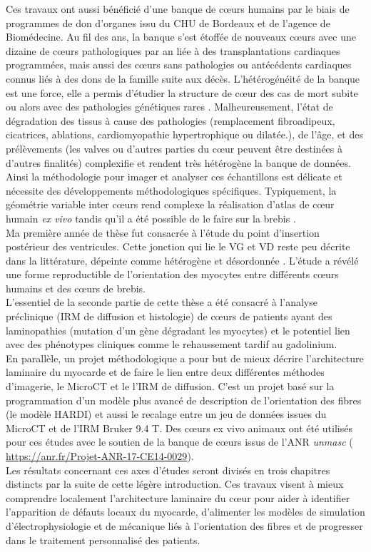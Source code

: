 Ces travaux ont aussi bénéficié d’une banque de cœurs humains par le biais de programmes de don d’organes issu du CHU de Bordeaux et de l’agence de Biomédecine. Au fil des ans, la banque s’est étoffée de nouveaux cœurs avec une dizaine de cœurs pathologiques par an liée à des transplantations cardiaques programmées, mais aussi des cœurs sans pathologies ou antécédents cardiaques connus liés à des dons de la famille suite aux décès. L’hétérogénéité de la banque est une force, elle a permis d’étudier la structure de cœur des cas de mort subite ou alors avec des pathologies génétiques rares \cite{estelle2023}. Malheureusement, l’état de dégradation des tissus à cause des pathologies (remplacement fibroadipeux,  cicatrices, ablations, cardiomyopathie hypertrophique ou dilatée.), de l’âge,  et des prélèvements (les valves ou d’autres parties du cœur peuvent être destinées à d’autres finalités) complexifie et rendent très hétérogène la banque de données. 
Ainsi la méthodologie pour imager et analyser ces échantillons est délicate et nécessite des développements méthodologiques spécifiques. Typiquement, la géométrie variable inter cœurs rend complexe la réalisation d’atlas de cœur humain \textit{ex vivo} tandis qu’il a été possible de le faire sur la brebis \cite{Magat2022}.
 \\
 Ma première année de thèse fut consacrée à l’étude du point d’insertion postérieur des ventricules. Cette jonction qui lie le VG et VD reste peu décrite dans la littérature, dépeinte comme hétérogène et désordonnée \cite{Smerup2008}. L’étude a révélé une forme reproductible de l’orientation des myocytes entre différents cœurs humains et des cœurs de brebis. 
 \\
  L'essentiel de la seconde partie de cette thèse a été consacré à l’analyse préclinique (IRM de diffusion et histologie) de cœurs de patients ayant des laminopathies (mutation d’un gène dégradant les myocytes) et le potentiel lien avec des phénotypes cliniques comme le rehaussement tardif au gadolinium.
\\
En parallèle, un projet méthodologique a pour but de mieux décrire l’architecture laminaire du myocarde et de faire le lien entre deux différentes méthodes d’imagerie, le MicroCT et le l’IRM de diffusion. C’est un projet basé sur la programmation d’un modèle plus avancé de description de l’orientation des fibres (le modèle HARDI) et aussi le recalage entre un jeu de données issues du MicroCT et de l’IRM Bruker 9.4 T. Des cœurs ex vivo animaux ont été utilisés pour ces études avec le soutien de la banque de cœurs issus de l’ANR \textit{unmasc} ( \href{https://anr.fr/Projet-ANR-17-CE14-0029}{https://anr.fr/Projet-ANR-17-CE14-0029}).
\\
Les résultats concernant ces axes d’études seront divisés en trois chapitres distincts par la suite de cette légère introduction. Ces travaux visent à mieux comprendre localement l’architecture laminaire du cœur pour aider à identifier l’apparition de défauts locaux du myocarde, d’alimenter les modèles de simulation d’électrophysiologie et de mécanique liés à l’orientation des fibres et de progresser dans le traitement personnalisé des patients.

